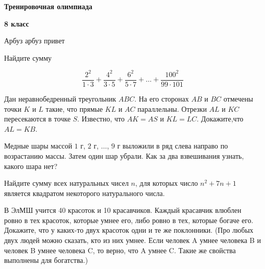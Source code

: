 \centerline{\bf \Huge Тренировочная олимпиада}
\centerline{\bf \Huge 8 класс}

\begin{flushright}
        \scriptsize{Арбуз арбуз привет}
\end{flushright}

Найдите сумму

$$
\frac{2^2}{1 \cdot 3}+\frac{4^2}{3 \cdot 5}+\frac{6^2}{5 \cdot 7}+\ldots+\frac{100^2}{99 \cdot 101}
$$


Дан неравнобедренный треугольник $A B C$. На его сторонах $A B$ и $B C$ отмечены точки $K$ и $L$ такие, что прямые $K L$ и $A C$ параллельны. Отрезки $A L$ и $K C$ пересекаются в точке $S$. Известно, что $A K=A S$ и $K L=L C$. Докажите,что $A L=K B$.

Медные шары массой $1$ г, $2$ г, $\ldots$, $9$ г выложили в ряд слева направо
по возрастанию массы. Затем один шар убрали. Как за два взвешивания
узнать, какого шара нет?

Найдите сумму всех натуральных чисел $n$, для которых число $n^2+7 n+1$ является квадратом некоторого натурального числа.

В ЭлМШ учится 40 красоток и 10 красавчиков. Каждый красавчик влюблен ровно в тех красоток, которые умнее его, либо ровно в тех, которые богаче его. Докажите, что у каких-то двух красоток одни и те же поклонники. (Про любых двух людей можно сказать, кто из них умнее. Если человек A умнее человека B и человек B умнее человека C, то верно, что A умнее C. Такие же свойства выполнены для богатства.)